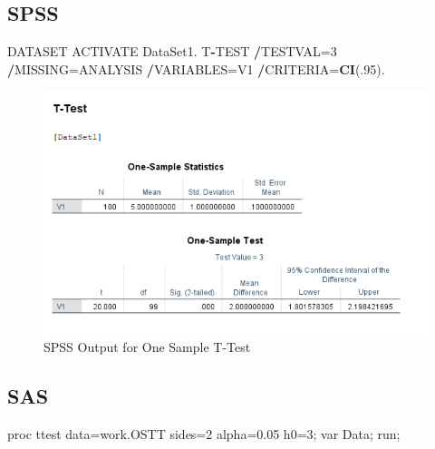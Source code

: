 \documentclass[
]{book}
\newenvironment{Shaded}{\begin{snugshade}}{\end{snugshade}}
\newcommand{\DecValTok}[1]{\textcolor[rgb]{0.00,0.00,0.81}{#1}}
\newcommand{\FloatTok}[1]{\textcolor[rgb]{0.00,0.00,0.81}{#1}}
\newcommand{\KeywordTok}[1]{\textcolor[rgb]{0.13,0.29,0.53}{\textbf{#1}}}
\newcommand{\NormalTok}[1]{#1}
\newcommand{\OperatorTok}[1]{\textcolor[rgb]{0.81,0.36,0.00}{\textbf{#1}}}
\begin{document}
\hypertarget{spss-4}{%
\subsection{SPSS}\label{spss-4}}

\begin{Shaded}
\begin{Highlighting}[]
\NormalTok{DATASET ACTIVATE DataSet1.}
\NormalTok{T}\OperatorTok{-}\NormalTok{TEST}
  \OperatorTok{/}\NormalTok{TESTVAL=}\DecValTok{3}
  \OperatorTok{/}\NormalTok{MISSING=ANALYSIS}
  \OperatorTok{/}\NormalTok{VARIABLES=V1}
  \OperatorTok{/}\NormalTok{CRITERIA=}\KeywordTok{CI}\NormalTok{(.}\DecValTok{95}\NormalTok{).}
\end{Highlighting}
\end{Shaded}

\begin{figure}[!h]
\includegraphics{Screenshots/One Sample T test/osttSPSS} \caption{\label{fig:osttSPSS}SPSS Output for One Sample T-Test}\label{fig:osttSPSS}
\end{figure}

\hypertarget{sas-4}{%
\subsection{SAS}\label{sas-4}}

\begin{Shaded}
\begin{Highlighting}[]
\NormalTok{proc ttest data=work.OSTT sides=}\DecValTok{2}\NormalTok{ alpha=}\FloatTok{0.05}\NormalTok{  h0=}\DecValTok{3}\NormalTok{;}
\NormalTok{      var Data;}
\NormalTok{   run;}
\end{Highlighting}
\end{Shaded}
\end{document}
